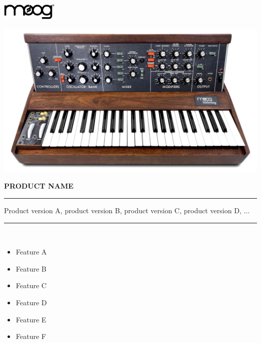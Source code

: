 \documentclass{article}
\begin{document}
\begin{titlepage} 
	\begin{flushright}
		\includegraphics[width=0.2\textwidth]{moog_logo}
	\end{flushright}
	\vfil
	\begin{center}
		\includegraphics[width=\textwidth]{minimoog}
	\end{center}
	\vfil
	\Huge
	\textbf{\uppercase{product name}} \\
	\rule{\textwidth}{1pt}
	\Large
	Product version A, product version B, product version C, product version D, $\ldots$\\
	\rule{\textwidth}{1pt}\\[0.5em]
	\begin{minipage}{0.5\textwidth}
		\begin{itemize}
			\item Feature A
			\item Feature B
			\item Feature C
		\end{itemize}
	\end{minipage}
	\hfill
	\begin{minipage}{0.5\textwidth}
		\begin{flushright}
			\begin{itemize}
				\item Feature D
				\item Feature E
				\item Feature F
			\end{itemize}
		\end{flushright}
	\end{minipage}
	\\[0.5em]

\end{titlepage}
\end{document}
